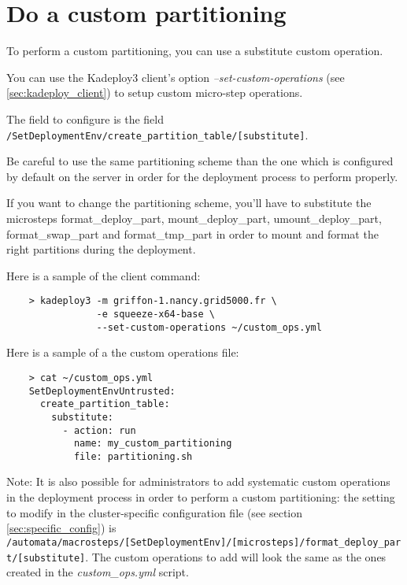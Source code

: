 \documentclass[a4wide,10pt,oneside]{book}
\newcommand{\ypath}[1]{\texttt{#1}}
\begin{document}
\section{Do a custom partitioning}\label{sec:custom-partitioning}
To perform a custom partitioning, you can use a substitute custom operation.

You can use the Kadeploy3 client's option \emph{--set-custom-operations} (see \ref{sec:kadeploy_client}) to setup custom micro-step operations.

The field to configure is the field \ypath{/SetDeploymentEnv/create\_partition\_table/[substitute]}.

Be careful to use the same partitioning scheme than the one which is configured by default on the server in order for the deployment process to perform properly.

If you want to change the partitioning scheme, you'll have to substitute the microsteps format\_deploy\_part, mount\_deploy\_part, umount\_deploy\_part, format\_swap\_part and format\_tmp\_part in order to mount and format the right partitions during the deployment.

Here is a sample of the client command:
\begin{verbatim}
    > kadeploy3 -m griffon-1.nancy.grid5000.fr \
                -e squeeze-x64-base \
                --set-custom-operations ~/custom_ops.yml
\end{verbatim}

Here is a sample of a the custom operations file:
\begin{small}
\begin{verbatim}
    > cat ~/custom_ops.yml
    SetDeploymentEnvUntrusted:
      create_partition_table:
        substitute:
          - action: run
            name: my_custom_partitioning
            file: partitioning.sh
\end{verbatim}
\end{small}

Note: It is also possible for administrators to add systematic custom operations in the deployment process in order to perform a custom partitioning: the setting to modify in the cluster-specific configuration file (see section \ref{sec:specific_config}) is \ypath{/automata/macrosteps/[SetDeploymentEnv]/[microsteps]/format\_deploy\_part/[substitute]}. The custom operations to add will look the same as the ones created in the \emph{custom\_ops.yml} script.
\end{document}
